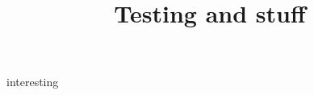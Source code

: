 \documentclass{article}
\title{Testing and stuff}
\begin{document}
  \maketitle
  \newpage
  \noindent
  interesting      
\end{document}
